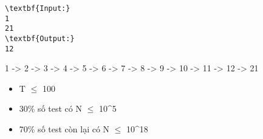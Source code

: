 \begin{verbatim}
\textbf{Input:}
1
21
\textbf{Output:}
12\end{verbatim}
1 -> 2 -> 3 -> 4 -> 5 -> 6 -> 7 -> 8 -> 9 -> 10 -> 11 -> 12 -> 21
\begin{itemize}
	\item T  $\le$  100
	\item 30\% số test có N  $\le$  10^5
	\item 70\% số test còn lại có N  $\le$  10^18
\end{itemize}